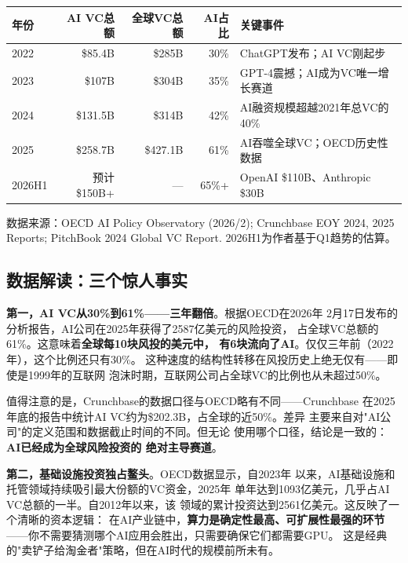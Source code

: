 \begin{keybox}[2022--2026 AI 投融资数据汇总]
\small
\begin{tabularx}{\textwidth}{l r r r l}
\toprule
\rowcolor{figLightGray}
\textbf{年份} & \textbf{AI VC总额} & \textbf{全球VC总额}
  & \textbf{AI占比} & \textbf{关键事件} \\
\midrule
2022 & \$85.4B  & \$285B  & 30\%
  & ChatGPT发布；AI VC刚起步 \\
\rowcolor{figLightGray}
2023 & \$107B   & \$304B  & 35\%
  & GPT-4震撼；AI成为VC唯一增长赛道 \\
2024 & \$131.5B & \$314B  & 42\%
  & AI融资规模超越2021年总VC的40\% \\
\rowcolor{figLightGray}
2025 & \$258.7B & \$427.1B & 61\%
  & AI吞噬全球VC；OECD历史性数据 \\
2026H1 & 预计\$150B+ & ---   & 65\%+
  & OpenAI \$110B、Anthropic \$30B \\
\bottomrule
\end{tabularx}

\medskip
\noindent 数据来源：OECD AI Policy Observatory (2026/2); Crunchbase EOY
2024, 2025 Reports; PitchBook 2024 Global VC Report.
2026H1为作者基于Q1趋势的估算。
\end{keybox}

\subsection{数据解读：三个惊人事实}

\textbf{第一，AI VC从30\%到61\%——三年翻倍}。根据OECD在2026年
2月17日发布的分析报告，AI公司在2025年获得了2587亿美元的风险投资，
占全球VC总额的61\%。这意味着\textbf{全球每10块风投的美元中，
有6块流向了AI}。仅仅三年前（2022年），这个比例还只有30\%。
这种速度的结构性转移在风投历史上绝无仅有——即使是1999年的互联网
泡沫时期，互联网公司占全球VC的比例也从未超过50\%。

值得注意的是，Crunchbase的数据口径与OECD略有不同——Crunchbase
在2025年底的报告中统计AI VC约为\$202.3B，占全球的近50\%。差异
主要来自对"AI公司"的定义范围和数据截止时间的不同。但无论
使用哪个口径，结论是一致的：\textbf{AI已经成为全球风险投资的
绝对主导赛道}。

\textbf{第二，基础设施投资独占鳌头}。OECD数据显示，自2023年
以来，AI基础设施和托管领域持续吸引最大份额的VC资金，2025年
单年达到1093亿美元，几乎占AI VC总额的一半。自2012年以来，该
领域的累计投资达到2561亿美元。这反映了一个清晰的资本逻辑：
在AI产业链中，\textbf{算力是确定性最高、可扩展性最强的环节}
——你不需要猜测哪个AI应用会胜出，只需要确保它们都需要GPU。
这是经典的"卖铲子给淘金者"策略，但在AI时代的规模前所未有。

